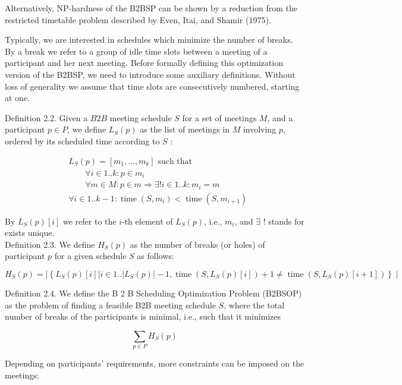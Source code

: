 \documentclass[10pt]{article}
\begin{document}
Alternatively, NP-hardness of the B2BSP can be shown by a reduction from the restricted timetable problem described by Even, Itai, and Shamir (1975).

Typically, we are interested in schedules which minimize the number of breaks. By a break we refer to a group of idle time slots between a meeting of a participant and her next meeting. Before formally defining this optimization version of the B2BSP, we need to introduce some auxiliary definitions. Without loss of generality we assume that time slots are consecutively numbered, starting at one.

Definition 2.2. Given a $B 2 B$ meeting schedule $S$ for a set of meetings $M$, and a participant $p \in P$, we define $L_{S}(p)$ as the list of meetings in $M$ involving $p$, ordered by its scheduled time according to $S$ :

$$
\begin{aligned}
& L_{S}(p)=\left[m_{1}, \ldots, m_{k}\right] \text { such that } \\
& \qquad \forall i \in 1 . . k: p \in m_{i} \\
& \qquad \forall m \in M: p \in m \Rightarrow \exists!i \in 1 . . k: m_{i}=m \\
& \forall i \in 1 . . k-1: \operatorname{time}\left(S, m_{i}\right)<\operatorname{time}\left(S, m_{i+1}\right)
\end{aligned}
$$

By $L_{S}(p)[i]$ we refer to the $i$-th element of $L_{S}(p)$, i.e., $m_{i}$, and $\exists$ ! stands for exists unique.\\
Definition 2.3. We define $H_{S}(p)$ as the number of breaks (or holes) of participant $p$ for a given schedule $S$ as follows:

$$
H_{S}(p)=\left|\left\{L_{S}(p)[i]\left|i \in 1 . .\left|L_{S}(p)\right|-1, \operatorname{time}\left(S, L_{S}(p)[i]\right)+1 \neq \operatorname{time}\left(S, L_{S}(p)[i+1]\right)\right\} \mid\right.\right.
$$

Definition 2.4. We define the B 2 B Scheduling Optimization Problem (B2BSOP) as the problem of finding a feasible B2B meeting schedule $S$, where the total number of breaks of the participants is minimal, i.e., such that it minimizes


\begin{equation*}
\sum_{p \in P} H_{S}(p) \tag{3}
\end{equation*}


Depending on participants' requirements, more constraints can be imposed on the meetings:
\end{document}
